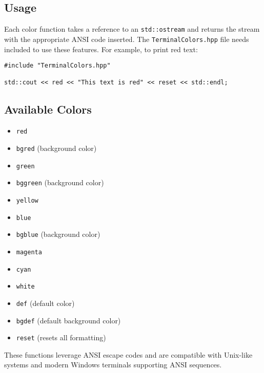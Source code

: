 \subsection*{Usage}

Each color function takes a reference to an \texttt{std::ostream} and returns the stream with the appropriate ANSI code inserted. The \texttt{TerminalColors.hpp} file needs included to use these features. For example, to print red text:

\begin{lstlisting}[style=cppstyle]
#include "TerminalColors.hpp"
	
std::cout << red << "This text is red" << reset << std::endl;
\end{lstlisting}

\subsection*{Available Colors}

\begin{multicols}{2}
\begin{itemize}\itemsep0em
	\item \texttt{red}
	\item \texttt{bgred} (background color)
	\item \texttt{green}
	\item \texttt{bggreen} (background color)
	\item \texttt{yellow}
	\item \texttt{blue}
	\item \texttt{bgblue} (background color)
	\item \texttt{magenta}
	\item \texttt{cyan}
	\item \texttt{white}
	\item \texttt{def} (default color)
	\item \texttt{bgdef} (default background color)
	\item \texttt{reset} (resets all formatting)
\end{itemize}
\end{multicols}
These functions leverage ANSI escape codes and are compatible with Unix-like systems and modern Windows terminals supporting ANSI sequences.



















